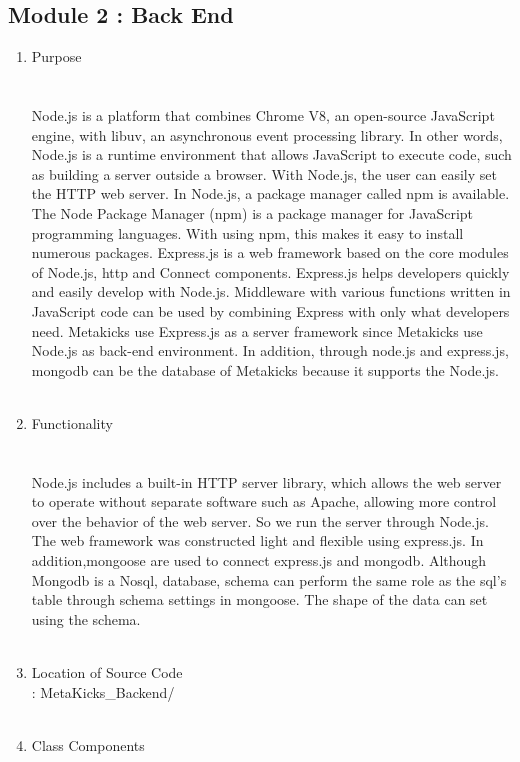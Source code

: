 \documentclass[conference]{IEEEtran}
\begin{document}
\subsection{Module 2 : Back End}
\begin{enumerate}
\item Purpose\\
\\\\Node.js is a platform that combines Chrome V8, an open-source JavaScript engine, with libuv, an asynchronous event processing library. In other words, Node.js is a runtime environment that allows JavaScript to execute code, such as building a server outside a browser. With Node.js, the user can easily set the HTTP web server. In Node.js, a package manager called npm is available. The Node Package Manager (npm) is a package manager for JavaScript programming languages. With using npm, this makes it easy to install numerous packages. Express.js is a web framework based on the core modules of Node.js, http and Connect components. Express.js helps developers quickly and easily develop with Node.js. Middleware with various functions written in JavaScript code can be used by combining Express with only what developers need. Metakicks use Express.js as a server framework since Metakicks use Node.js as back-end environment. In addition, through node.js and express.js, mongodb can be the database of Metakicks because it supports the Node.js.\\\\
\item Functionality\\
\\\\Node.js includes a built-in HTTP server library, which allows the web server to operate without separate software such as Apache, allowing more control over the behavior of the web server. So we run the server through Node.js. The web framework was constructed light and flexible using express.js. In addition,mongoose are used to connect express.js and mongodb. Although Mongodb is a Nosql, database, schema can perform the same role as the sql's table through schema settings in mongoose. The shape of the data can set using the schema.\\\\
\item Location of Source Code\\
: MetaKicks\_Backend/\\\\
\item Class Components\\

\end{enumerate}
\end{document}
